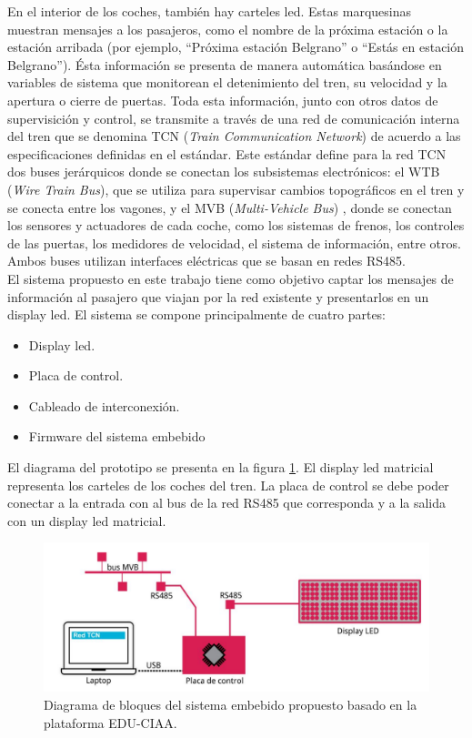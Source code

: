 En el interior de los coches, también hay carteles led. Estas marquesinas muestran mensajes a los pasajeros, como el nombre de la próxima estación o la estación arribada (por ejemplo, “Próxima estación Belgrano” o “Estás en estación Belgrano”). Ésta información se
presenta de manera automática basándose en variables de sistema que monitorean el detenimiento del tren, su velocidad y la apertura o cierre de puertas. Toda esta información, junto con otros datos de supervisición y control, se transmite a través de una red de comunicación interna del tren que se denomina TCN (\textit{Train Communication Network}) de acuerdo a las especificaciones definidas en el estándar\citep{IEC-61375-1999}. Este estándar define para la red TCN dos buses jerárquicos donde se conectan los subsistemas electrónicos: el WTB (\textit{Wire Train Bus}), que se utiliza para supervisar cambios topográficos en el tren y se conecta entre los vagones, y el MVB (\textit{Multi-Vehicle Bus}) \citep{CSN-EN-61375-2-1}\citep{IEC-61375-3-1:2012}, donde se conectan los sensores y actuadores de cada coche, como los sistemas de frenos, los controles de las puertas, los medidores de velocidad, el sistema de información, entre otros. Ambos buses utilizan interfaces eléctricas que se basan en redes RS485.\\


 El sistema propuesto en este trabajo tiene como objetivo captar los mensajes de información al pasajero que viajan por la red existente y presentarlos en un display led. El sistema se compone principalmente de cuatro partes:
 \begin{itemize}
\item Display led.
\item Placa de control.
\item Cableado de interconexión.
\item Firmware del sistema embebido
 \end{itemize}

El diagrama del prototipo se presenta en la figura \ref{fig:diagramaPIDSCIAA}. El display led matricial representa los carteles de los coches del tren. La placa de control se debe poder conectar a la entrada con al bus de la red RS485 que corresponda y a la salida con un display led matricial.

\begin{figure}[ht]
	\centering
	\includegraphics[width=1\textwidth]{./Figures/diagramaPIDSCIAA.png}
	\caption{Diagrama de bloques del sistema embebido propuesto basado en la plataforma EDU-CIAA.}
	\label{fig:diagramaPIDSCIAA}
\end{figure}


